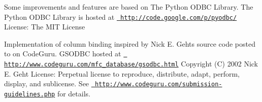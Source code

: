 Some improvements and features are based on The Python O\+D\+BC Library. The Python O\+D\+BC Library is hosted at \href{http://code.google.com/p/pyodbc/}{\texttt{ http\+://code.\+google.\+com/p/pyodbc/}} License\+: The M\+IT License

Implementation of column binding inspired by Nick E. Geht\textquotesingle{}s source code posted to on Code\+Guru. G\+S\+O\+D\+BC hosted at \href{http://www.codeguru.com/mfc_database/gsodbc.html}{\texttt{ http\+://www.\+codeguru.\+com/mfc\+\_\+database/gsodbc.\+html}} Copyright (C) 2002 Nick E. Geht License\+: Perpetual license to reproduce, distribute, adapt, perform, display, and sublicense. See \href{http://www.codeguru.com/submission-guidelines.php}{\texttt{ http\+://www.\+codeguru.\+com/submission-\/guidelines.\+php}} for details.  